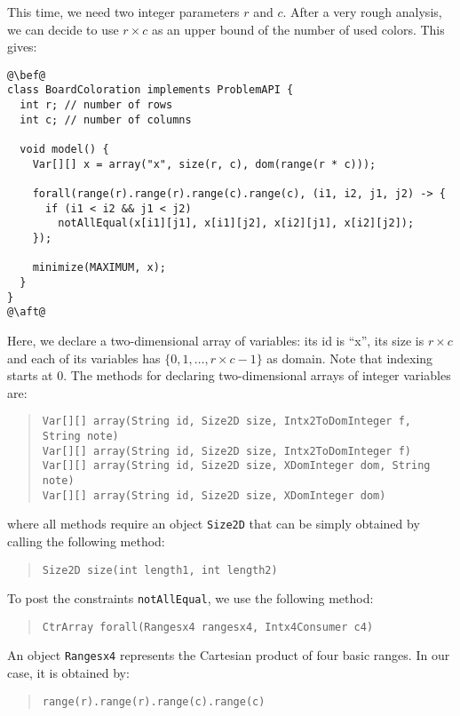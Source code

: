 \documentclass[10pt]{article}
\newcommand{\gb}[1]{{\tt #1}} %
\newcommand{\nn}[1]{{\tt #1}} %
\begin{document}
This time, we need two integer parameters $r$ and $c$.
After a very rough analysis, we can decide to use $r \times c$ as an upper bound of the number of used colors. 
This gives:


\begin{lstlisting}
@\bef@
class BoardColoration implements ProblemAPI {
  int r; // number of rows 
  int c; // number of columns

  void model() {
    Var[][] x = array("x", size(r, c), dom(range(r * c)));
    
    forall(range(r).range(r).range(c).range(c), (i1, i2, j1, j2) -> {
      if (i1 < i2 && j1 < j2)
        notAllEqual(x[i1][j1], x[i1][j2], x[i2][j1], x[i2][j2]);
    });
    
    minimize(MAXIMUM, x);
  }
}
@\aft@
\end{lstlisting}

Here, we declare a two-dimensional array of variables: its id is ``x'', its size is $r \times c$ and each of its variables has $\{0,1,\dots,r\times c-1\}$ as domain.
Note that indexing starts at 0.
The methods for declaring two-dimensional arrays of integer variables are:

\begin{quote}
\begin{verbatim}
Var[][] array(String id, Size2D size, Intx2ToDomInteger f, String note) 
Var[][] array(String id, Size2D size, Intx2ToDomInteger f) 
Var[][] array(String id, Size2D size, XDomInteger dom, String note) 
Var[][] array(String id, Size2D size, XDomInteger dom) 
\end{verbatim}
\end{quote}

where all methods require an object \nn{Size2D} that can be simply obtained by calling the following method:
\begin{quote}
\begin{verbatim}
Size2D size(int length1, int length2)
\end{verbatim}
\end{quote}

To post the constraints \gb{notAllEqual}, we use the following method:

\begin{quote}
\begin{verbatim}
CtrArray forall(Rangesx4 rangesx4, Intx4Consumer c4) 
\end{verbatim}
\end{quote}

An object \nn{Rangesx4} represents the Cartesian product of four basic ranges. In our case, it is obtained by:
\begin{quote}
\begin{verbatim}
range(r).range(r).range(c).range(c)
\end{verbatim}
\end{quote}
\end{document}
